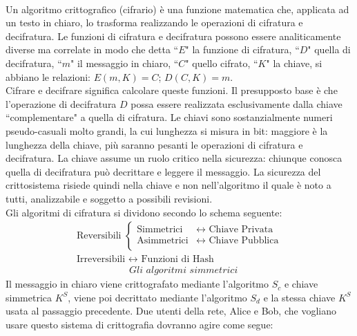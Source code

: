 \documentclass[a4paper,12pt]{tesiinfo}
\begin{document}
\\
Un algoritmo crittografico (cifrario) \`e una funzione matematica che, applicata ad un testo in chiaro, lo trasforma realizzando le operazioni di cifratura e decifratura. Le funzioni di cifratura e decifratura possono essere analiticamente diverse ma correlate in modo che detta ``$E$" la funzione di cifratura, ``$D$" quella di decifratura, ``$m$" il messaggio in chiaro, ``$C$" quello cifrato, ``$K$" la chiave, si abbiano le relazioni: $E(m, K) = C$; $D(C, K) = m$.
\\
Cifrare e decifrare significa calcolare queste funzioni. Il presupposto base \`e che l'operazione di decifratura $D$ possa essere realizzata esclusivamente dalla chiave ``complementare" a quella di cifratura. Le chiavi sono sostanzialmente numeri pseudo-casuali molto grandi, la cui lunghezza si misura in bit: maggiore \`e la lunghezza della chiave, pi\`u saranno pesanti le operazioni di cifratura e decifratura. La chiave assume un ruolo critico nella sicurezza: chiunque conosca quella di decifratura pu\`o decrittare e leggere il messaggio. La sicurezza del crittosistema risiede quindi nella chiave e non nell'algoritmo il quale \`e noto a tutti, analizzabile e soggetto a possibili revisioni.
\\
Gli algoritmi di cifratura si dividono secondo lo schema seguente:
\begin{align*} 
&\text{Reversibili } \begin{cases}
                    \text{Simmetrici} & \longleftrightarrow \text{ Chiave Privata}\\
                    \text{Asimmetrici} & \longleftrightarrow \text{ Chiave Pubblica}\\
               \end{cases}\\
&\text{Irreversibili } \longleftrightarrow \text{ Funzioni di Hash} &
\end{align*}
%
%
%
\begin{align*}
&\textit{Gli algoritmi simmetrici}
\end{align*}
Il messaggio in chiaro viene crittografato mediante l'algoritmo $S_c$ e chiave simmetrica $K^S$, viene poi decrittato mediante l'algoritmo $S_d$ e la stessa chiave $K^S$ usata al passaggio precedente. Due utenti della rete, Alice e Bob, che vogliano usare questo sistema di crittografia dovranno agire come segue: 
\end{document}

